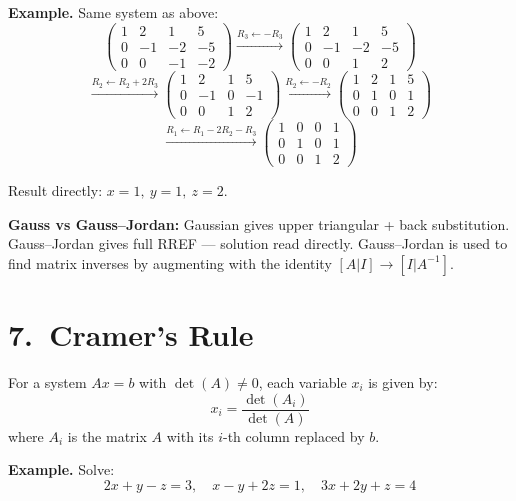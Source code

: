 \documentclass[12pt]{article}
\begin{document}
\textbf{Example.} Same system as above:
\[
\begin{pmatrix}1&2&1&5\\0&-1&-2&-5\\0&0&-1&-2\end{pmatrix}
\xrightarrow{R_3\leftarrow -R_3}
\begin{pmatrix}1&2&1&5\\0&-1&-2&-5\\0&0&1&2\end{pmatrix}
\]
\[
\xrightarrow{R_2\leftarrow R_2+2R_3}
\begin{pmatrix}1&2&1&5\\0&-1&0&-1\\0&0&1&2\end{pmatrix}
\xrightarrow{R_2\leftarrow -R_2}
\begin{pmatrix}1&2&1&5\\0&1&0&1\\0&0&1&2\end{pmatrix}
\]
\[
\xrightarrow{R_1\leftarrow R_1-2R_2-R_3}
\begin{pmatrix}1&0&0&1\\0&1&0&1\\0&0&1&2\end{pmatrix}
\]

Result directly: $x=1,\ y=1,\ z=2$.

\begin{notebox}
\textbf{Gauss vs Gauss--Jordan:} Gaussian gives upper triangular + back substitution. Gauss--Jordan gives full RREF --- solution read directly. Gauss--Jordan is used to find matrix inverses by augmenting with the identity $[A|I] \rightarrow [I|A^{-1}]$.
\end{notebox}

\section{7.\ Cramer's Rule}

\begin{defbox}
For a system $Ax = b$ with $\det(A) \neq 0$, each variable $x_i$ is given by:
\[
x_i = \frac{\det(A_i)}{\det(A)}
\]
where $A_i$ is the matrix $A$ with its $i$-th column replaced by $b$.
\end{defbox}

\textbf{Example.} Solve:
\[
2x + y - z = 3,\quad x - y + 2z = 1,\quad 3x + 2y + z = 4
\]
\end{document}

